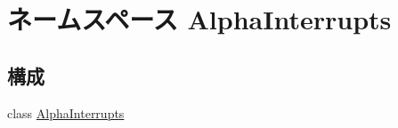 \hypertarget{namespaceAlphaInterrupts}{
\section{ネームスペース AlphaInterrupts}
\label{namespaceAlphaInterrupts}
}
\subsection*{構成}
\begin{DoxyCompactItemize}
\item 
class \hyperlink{classAlphaInterrupts_1_1AlphaInterrupts}{AlphaInterrupts}
\end{DoxyCompactItemize}
